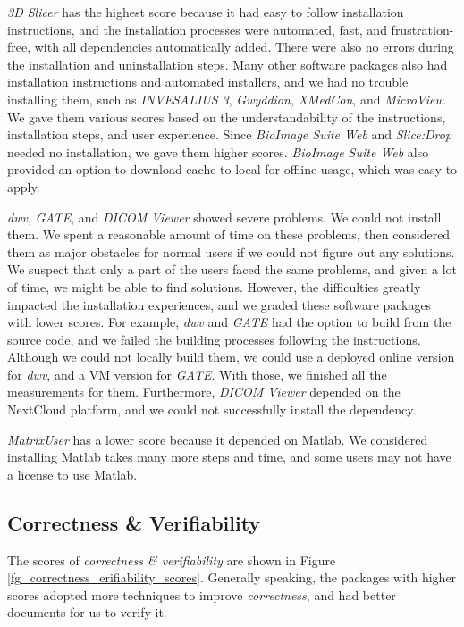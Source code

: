 \documentclass[3p, 12pt,authoryear]{elsarticle}
\begin{document}
\textit{3D Slicer} has the highest score because it had easy to follow
installation instructions, and the installation processes were automated, fast,
and frustration-free, with all dependencies automatically added. There were also
no errors during the installation and uninstallation steps. Many other software
packages also had installation instructions and automated installers, and we had
no trouble installing them, such as \textit{INVESALIUS 3}, \textit{Gwyddion},
\textit{XMedCon}, and \textit{MicroView}. We gave them various scores based on
the understandability of the instructions, installation steps, and user
experience. Since \textit{BioImage Suite Web} and \textit{Slice:Drop} needed no
installation, we gave them higher scores. \textit{BioImage Suite Web} also
provided an option to download cache to local for offline usage, which was easy
to apply.

\textit{dwv}, \textit{GATE}, and \textit{DICOM Viewer} showed severe problems.
We could not install them. We spent a reasonable amount of time on these
problems, then considered them as major obstacles for normal users if we could
not figure out any solutions. We suspect that only a part of the users faced the
same problems, and given a lot of time, we might be able to find solutions.
However, the difficulties greatly impacted the installation experiences, and we
graded these software packages with lower scores. For example, \textit{dwv} and
\textit{GATE} had the option to build from the source code, and we failed the
building processes following the instructions. Although we could not locally
build them, we could use a deployed online version for \textit{dwv}, and a VM
version for \textit{GATE}. With those, we finished all the measurements for
them. Furthermore, \textit{DICOM Viewer} depended on the NextCloud platform, and
we could not successfully install the dependency.

\textit{MatrixUser} has a lower score because it depended on Matlab. We
considered installing Matlab takes many more steps and time, and some users may
not have a license to use Matlab.

\subsection{Correctness \& Verifiability} \label{sec_result_correctness_verifiability}

The scores of \textit{correctness \& verifiability} are shown in Figure
\ref{fg_correctness_erifiability_scores}. Generally speaking, the packages with
higher scores adopted more techniques to improve \textit{correctness}, and had
better documents for us to verify it.
\end{document}
